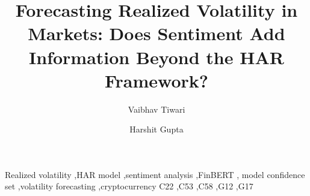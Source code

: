 \documentclass[3p,times]{elsarticle}
\begin{document}
\begin{frontmatter}

\title{Forecasting Realized Volatility in Markets: Does Sentiment Add
       Information Beyond the HAR Framework?}

\author[vit]{Vaibhav Tiwari}
\author[vit]{Harshit Gupta}
\address[vit]{Department of Computer Science and Engineering (AI \& ML),
              VIT Bhopal University, Bhopal, India}



\begin{keyword}
Realized volatility \sep HAR model \sep sentiment analysis \sep FinBERT \sep
model confidence set \sep volatility forecasting \sep cryptocurrency
\JEL C22 \sep C53 \sep C58 \sep G12 \sep G17
\end{keyword}

\end{frontmatter}

\linenumbers














\appendix

\end{document}
